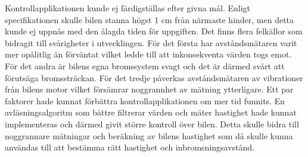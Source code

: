 \documentclass[a4paper]{article}
\begin{document}
\vspace{5mm} 
\noindent
Kontrollapplikationen kunde ej färdigställas efter givna mål. Enligt specifikationen skulle bilen stanna högst 1 cm från närmaste hinder, men detta kunde ej uppnås med den ålagda tiden för uppgiften. Det finns flera felkällor som bidragit till svårigheter i utvecklingen. För det första har avståndsmätaren varit mer opålitlig än förväntat vilket ledde till att inkonsekventa värden togs emot. För det andra är bilens egna bromssystem svagt och det är därmed svårt att förutsäga bromssträckan. För det tredje påverkas avståndsmätaren av vibrationer från bilens motor vilket försämrar noggrannhet av mätning ytterligare. Ett par faktorer hade kunnat förbättra kontrollapplikationen om mer tid funnits. En avläsningsalgoritm som bättre filtrerar värden och mäter hastighet hade kunnat implementeras och därmed givit större kontroll över bilen. Detta skulle bidra till noggrannare mätningar och beräkning av bilens hastighet som då skulle kunna användas till att bestämma rätt hastighet och inbromsningsavstånd.%

\end{document}
